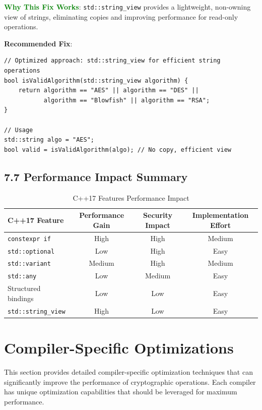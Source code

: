 \documentclass[11pt,a4paper]{article}
\begin{document}
\textcolor{green}{\textbf{Why This Fix Works}}: \texttt{std::string\_view} provides a lightweight, non-owning view of strings, eliminating copies and improving performance for read-only operations.

\textbf{Recommended Fix}:
\begin{lstlisting}
// Optimized approach: std::string_view for efficient string operations
bool isValidAlgorithm(std::string_view algorithm) {
    return algorithm == "AES" || algorithm == "DES" || 
           algorithm == "Blowfish" || algorithm == "RSA";
}

// Usage
std::string algo = "AES";
bool valid = isValidAlgorithm(algo); // No copy, efficient view
\end{lstlisting}

\subsection{7.7 Performance Impact Summary}

\begin{table}[h]
\centering
\begin{tabular}{|l|c|c|c|}
\hline
\textbf{C++17 Feature} & \textbf{Performance Gain} & \textbf{Security Impact} & \textbf{Implementation Effort} \\
\hline
\texttt{constexpr if} & High & High & Medium \\
\hline
\texttt{std::optional} & Low & High & Easy \\
\hline
\texttt{std::variant} & Medium & High & Medium \\
\hline
\texttt{std::any} & Low & Medium & Easy \\
\hline
Structured bindings & Low & Low & Easy \\
\hline
\texttt{std::string\_view} & High & Low & Easy \\
\hline
\end{tabular}
\caption{C++17 Features Performance Impact}
\end{table}

\section{Compiler-Specific Optimizations}

This section provides detailed compiler-specific optimization techniques that can significantly improve the performance of cryptographic operations. Each compiler has unique optimization capabilities that should be leveraged for maximum performance.
\end{document}
